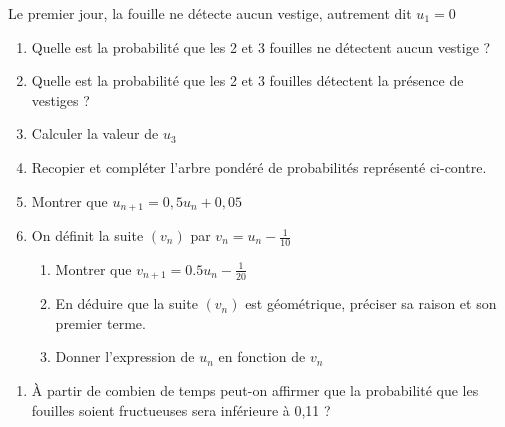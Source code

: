 \documentclass[oneside,12pt]{article}          %
\begin{document}
Le premier jour, la fouille ne détecte aucun vestige, autrement dit $u_1=0$

\begin{minipage}{0.6\linewidth}
\begin{enumerate}
	\item Quelle est la probabilité que les 2 et 3 fouilles ne détectent aucun vestige ?
	\item Quelle est la probabilité que les 2 et 3 fouilles détectent la présence de vestiges ?
	\item Calculer la valeur de $u_3$
	\item Recopier et compléter l'arbre pondéré de probabilités représenté ci-contre.
	\item Montrer que $u_{n+1}=0,5u_n+0,05$
	\item On définit la suite $(v_n)$ par $v_n=u_n-\frac{1}{10}$
	\begin{enumerate}
		\item Montrer que $v_{n+1}=0.5u_n-\frac{1}{20}$
		\item En déduire que la suite $(v_n)$ est géométrique, préciser sa raison et son premier terme.
		\item Donner l'expression de $u_n$ en fonction de $v_n$
	\end{enumerate}
\end{enumerate}
\end{minipage}
\begin{minipage}{0.39\textwidth}
\end{minipage}
\begin{enumerate}
	\item[\faCalculator] À partir de combien de temps peut-on affirmer que la probabilité que les fouilles soient fructueuses sera inférieure à 0,11 ?
\end{enumerate}
\end{document}
